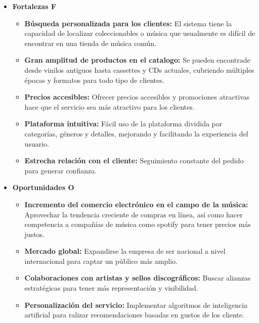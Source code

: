 \documentclass[12pt]{article}
\begin{document}
\begin{itemize}
	\item \textbf{Fortalezas F} 

	\begin{itemize}
		\item \textbf{Búsqueda personalizada para los clientes:} El sistema tiene la capacidad de localizar coleccionables o música que usualmente es difícil de encontrar en una tienda de música común.

		\item \textbf{Gran amplitud de productos en el catalogo:} Se pueden encontrade desde vinilos antiguos hasta cassettes y CDs actuales, cubriendo múltiples épocas y formatos para todo tipo de clientes.

		\item \textbf{Precios accesibles:} Ofrecer precios accesibles y promociones atractivas hace que el servicio sea más atractivo para los clientes.

		\item \textbf{Plataforma intuitiva:} Fácil uso de la plataforma dividida por categorías, géneros y detalles, mejorando y facilitando la experiencia del usuario.

		\item \textbf{Estrecha relación con el cliente:} Seguimiento constante del pedido para generar confianza.

	\end{itemize}

	\item \textbf{Oportunidades O}

	\begin{itemize}
		\item \textbf{Incremento del comercio electrónico en el campo de la música:} Aprovechar la tendencia creciente de compras en línea, así como hacer competencia a compañías de música como spotify para tener precios más justos.

		\item \textbf{Mercado global:} Expandirse la empresa de ser nacional a nivel internacional para captar un público más amplio.

		\item \textbf{Colaboraciones con artistas y sellos discográficos:} Buscar alianzas estratégicas para tener más representación y visibilidad.

		\item \textbf{Personalización del servicio:} Implementar algoritmos de inteligencia artificial para ralizar recomendaciones basadas en gustos de los cliente.


\end{itemize}
\end{itemize}
\end{document}
